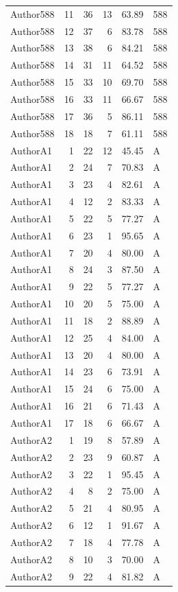 \begin{longtable}{lrrrrl}
Author588 & 11 & 36 & 13 & 63.89 & 588\\
Author588 & 12 & 37 & 6 & 83.78 & 588\\
Author588 & 13 & 38 & 6 & 84.21 & 588\\
Author588 & 14 & 31 & 11 & 64.52 & 588\\
Author588 & 15 & 33 & 10 & 69.70 & 588\\
Author588 & 16 & 33 & 11 & 66.67 & 588\\
Author588 & 17 & 36 & 5 & 86.11 & 588\\
Author588 & 18 & 18 & 7 & 61.11 & 588\\
AuthorA1 & 1 & 22 & 12 & 45.45 & A\\
AuthorA1 & 2 & 24 & 7 & 70.83 & A\\
AuthorA1 & 3 & 23 & 4 & 82.61 & A\\
AuthorA1 & 4 & 12 & 2 & 83.33 & A\\
AuthorA1 & 5 & 22 & 5 & 77.27 & A\\
AuthorA1 & 6 & 23 & 1 & 95.65 & A\\
AuthorA1 & 7 & 20 & 4 & 80.00 & A\\
AuthorA1 & 8 & 24 & 3 & 87.50 & A\\
AuthorA1 & 9 & 22 & 5 & 77.27 & A\\
AuthorA1 & 10 & 20 & 5 & 75.00 & A\\
AuthorA1 & 11 & 18 & 2 & 88.89 & A\\
AuthorA1 & 12 & 25 & 4 & 84.00 & A\\
AuthorA1 & 13 & 20 & 4 & 80.00 & A\\
AuthorA1 & 14 & 23 & 6 & 73.91 & A\\
AuthorA1 & 15 & 24 & 6 & 75.00 & A\\
AuthorA1 & 16 & 21 & 6 & 71.43 & A\\
AuthorA1 & 17 & 18 & 6 & 66.67 & A\\
AuthorA2 & 1 & 19 & 8 & 57.89 & A\\
AuthorA2 & 2 & 23 & 9 & 60.87 & A\\
AuthorA2 & 3 & 22 & 1 & 95.45 & A\\
AuthorA2 & 4 & 8 & 2 & 75.00 & A\\
AuthorA2 & 5 & 21 & 4 & 80.95 & A\\
AuthorA2 & 6 & 12 & 1 & 91.67 & A\\
AuthorA2 & 7 & 18 & 4 & 77.78 & A\\
AuthorA2 & 8 & 10 & 3 & 70.00 & A\\
AuthorA2 & 9 & 22 & 4 & 81.82 & A\\

\end{longtable}
